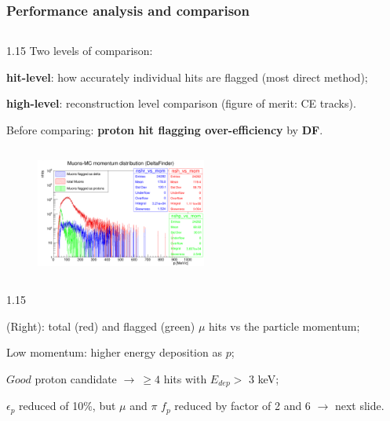 \documentclass{beamer}
\begin{document}
\begin{frame}
\frametitle{Performance analysis and comparison}
\vspace{-2mm}
  \begin{columns}
        \begin{column}{1.15\framewidth}
       {\footnotesize Two levels of comparison:}
    \setlength{\leftmargini}{1.2em}
    \begin{itemize}
      {\footnotesize  \item \textbf{hit-level}: how accurately individual hits are flagged (most direct method);
    \item \textbf{high-level}: reconstruction level comparison (figure of merit: CE tracks).
    \vspace{-1mm}
\item Before comparing: \textbf{proton hit flagging over-efficiency} by \textbf{DF}.}
    \end{itemize}
    \end{column}
    \end{columns}
        \vspace{-1mm}
       
        \begin{figure}[!h]
            \centering
            \includegraphics[width =0.5\textwidth]{figures/png/Screenshot_20240805_222923.png}
           \label{fig:0pbarbefore}
        \end{figure}
        
 
    \vspace{-3mm}
    \begin{columns}
        \begin{column}{1.15\framewidth}
    \setlength{\leftmargini}{1.2em}
    \begin{itemize}
      {\footnotesize  
\item (Right): total (red) and flagged (green) $\mu$ hits vs the particle momentum;
\vspace{1mm}
\item Low momentum: higher energy deposition as $p$;
\vspace{1mm}
\item $Good$ proton candidate $\rightarrow \ \geq 4$
hits with $E_{dep} >$ 3 keV; 
\item $\epsilon_p$ reduced of 10\%, but $\mu$ and $\pi$ $f_p$ reduced by factor of 2 and 6 $\rightarrow$ next slide.
}
      \end{itemize}
      \end{column}
      \end{columns}
\end{frame}
\end{document}

